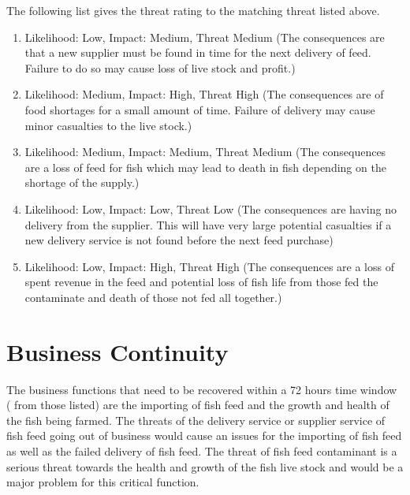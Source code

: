 \documentclass[paper=a4, fontsize=11pt]{scrartcl} %
\numberwithin{equation}{section} %
\numberwithin{figure}{section} %
\numberwithin{table}{section} %
\begin{document}
The following list gives the threat rating to the matching threat listed above.

\begin{enumerate}

\item Likelihood: Low, Impact: Medium, Threat Medium (The consequences are that a new
supplier must be found in time for the next delivery of feed. Failure to do so may cause
loss of live stock and profit.)
\item Likelihood: Medium, Impact: High, Threat High (The consequences are of food 
shortages for a small amount of time. Failure of delivery may cause minor casualties
to the live stock.)
\item Likelihood: Medium, Impact: Medium, Threat Medium (The consequences are a loss
of feed for fish which may lead to death in fish depending on the shortage of the
supply.)
\item Likelihood: Low, Impact: Low, Threat Low (The consequences are having no delivery
from the supplier. This will have very large potential casualties if a new delivery 
service is not found before the next feed purchase)
\item Likelihood: Low, Impact: High, Threat High (The consequences are a loss of 
spent revenue in the feed and potential loss of fish life from those fed the contaminate
and death of those not fed all together.)

\end{enumerate}




\section{Business Continuity}

The business functions that need to be recovered within a 72 hours time window (
from those listed) are the importing of fish feed and the growth and health of 
the fish being farmed. The threats of the delivery service or supplier service of fish
feed going out of business would cause an issues for the importing of fish feed as
well as the failed delivery of fish feed. The threat of fish feed contaminant is a
serious threat towards the health and growth of the fish live stock and would be a
major problem for this critical function.\\
\end{document}
